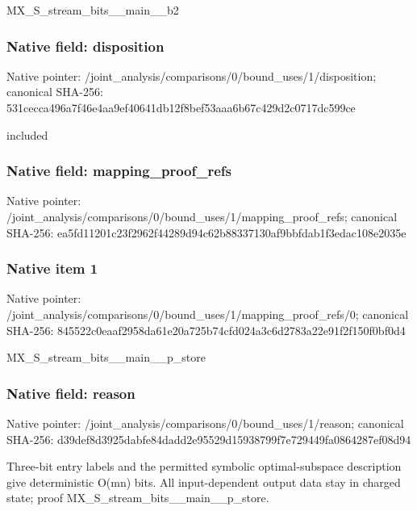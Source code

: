\documentclass[10pt,a4paper]{article}
\begin{document}
\begingroup\raggedright\sloppy MX\_\allowbreak{}S\_\allowbreak{}stream\_\allowbreak{}bits\_\allowbreak{}\_\allowbreak{}main\_\allowbreak{}\_\allowbreak{}b2\par\endgroup

\subsubsection{Native field: disposition}
Native pointer: /joint\_\allowbreak{}analysis/comparisons/0/bound\_\allowbreak{}uses/1/disposition; canonical SHA-256: 531cecca496a7f46e4aa9ef40641db12f8bef53aaa6b67c429d2c0717dc599ce

\begingroup\raggedright\sloppy included\par\endgroup

\subsubsection{Native field: mapping\_\allowbreak{}proof\_\allowbreak{}refs}
Native pointer: /joint\_\allowbreak{}analysis/comparisons/0/bound\_\allowbreak{}uses/1/mapping\_\allowbreak{}proof\_\allowbreak{}refs; canonical SHA-256: ea5fd11201c23f2962f44289d94c62b88337130af9bbfdab1f3edac108e2035e

\subsubsection{Native item 1}
Native pointer: /joint\_\allowbreak{}analysis/comparisons/0/bound\_\allowbreak{}uses/1/mapping\_\allowbreak{}proof\_\allowbreak{}refs/0; canonical SHA-256: 845522c0eaaf2958da61e20a725b74cfd024a3c6d2783a22e91f2f150f0bf0d4

\begingroup\raggedright\sloppy MX\_\allowbreak{}S\_\allowbreak{}stream\_\allowbreak{}bits\_\allowbreak{}\_\allowbreak{}main\_\allowbreak{}\_\allowbreak{}p\_\allowbreak{}store\par\endgroup

\subsubsection{Native field: reason}
Native pointer: /joint\_\allowbreak{}analysis/comparisons/0/bound\_\allowbreak{}uses/1/reason; canonical SHA-256: d39def8d3925dabfe84dadd2e95529d15938799f7e729449fa0864287ef08d94

\begingroup\raggedright\sloppy Three-bit entry labels and the permitted symbolic optimal-subspace description give deterministic O(mn) bits. All input-dependent output data stay in charged state;\allowbreak{} proof MX\_\allowbreak{}S\_\allowbreak{}stream\_\allowbreak{}bits\_\allowbreak{}\_\allowbreak{}main\_\allowbreak{}\_\allowbreak{}p\_\allowbreak{}store.\par\endgroup
\end{document}
